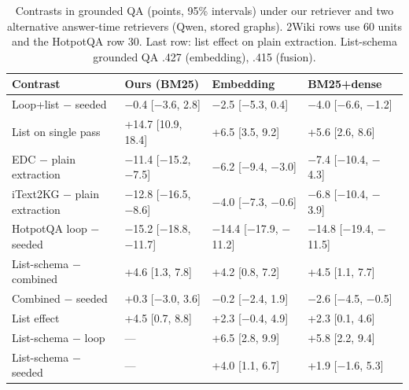 \begin{table}[t]
\centering
\caption{Contrasts in grounded QA (points, 95\% intervals) under our retriever and two alternative answer-time retrievers (Qwen, stored graphs). 2Wiki rows use 60 units and the HotpotQA row 30. Last row: list effect on plain extraction. List-schema grounded QA .427 (embedding), .415 (fusion).}
\label{tab:altret}
\scriptsize\setlength{\tabcolsep}{1.5pt}
\begin{tabular}{P{2.35cm}P{2.1cm}P{2.1cm}P{2.1cm}}
\toprule
Contrast & Ours (BM25) & Embedding & BM25+dense \\
\midrule
Loop+list $-$ seeded & $-$0.4 [$-$3.6, 2.8] & $-$2.5 [$-$5.3, 0.4] & $-$4.0 [$-$6.6, $-$1.2] \\
List on single pass & +14.7 [10.9, 18.4] & +6.5 [3.5, 9.2] & +5.6 [2.6, 8.6] \\
EDC $-$ plain extraction & $-$11.4 [$-$15.2, $-$7.5] & $-$6.2 [$-$9.4, $-$3.0] & $-$7.4 [$-$10.4, $-$4.3] \\
iText2KG $-$ plain extraction & $-$12.8 [$-$16.5, $-$8.6] & $-$4.0 [$-$7.3, $-$0.6] & $-$6.8 [$-$10.4, $-$3.9] \\
HotpotQA loop $-$ seeded & $-$15.2 [$-$18.8, $-$11.7] & $-$14.4 [$-$17.9, $-$11.2] & $-$14.8 [$-$19.4, $-$11.5] \\
List-schema $-$ combined & +4.6 [1.3, 7.8] & +4.2 [0.8, 7.2] & +4.5 [1.1, 7.7] \\
Combined $-$ seeded & +0.3 [$-$3.0, 3.6] & $-$0.2 [$-$2.4, 1.9] & $-$2.6 [$-$4.5, $-$0.5] \\
List effect & +4.5 [0.7, 8.8] & +2.3 [$-$0.4, 4.9] & +2.3 [0.1, 4.6] \\
\midrule
List-schema $-$ loop & --- & +6.5 [2.8, 9.9] & +5.8 [2.2, 9.4] \\
List-schema $-$ seeded & --- & +4.0 [1.1, 6.7] & +1.9 [$-$1.6, 5.3] \\
\bottomrule
\end{tabular}
\end{table}


